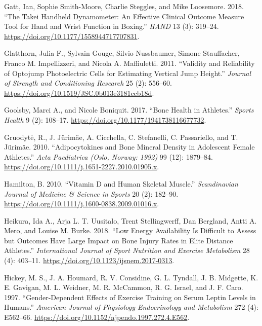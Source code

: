 \documentclass[
]{article}
\newlength{\cslhangindent}
\newenvironment{CSLReferences}[2] %
 {\begin{list}{}{%
  \setlength{\itemindent}{0pt}
  \setlength{\leftmargin}{0pt}
  \setlength{\parsep}{0pt}
  \ifodd #1
   \setlength{\leftmargin}{\cslhangindent}
   \setlength{\itemindent}{-1\cslhangindent}
  \fi
  \setlength{\itemsep}{#2\baselineskip}}}
 {\end{list}}
\begin{document}
\begin{CSLReferences}{1}{0}
Gatt, Ian, Sophie Smith-Moore, Charlie Steggles, and Mike Loosemore. 2018. {``The {Takei} {Handheld} {Dynamometer}: {An} {Effective} {Clinical} {Outcome} {Measure} {Tool} for {Hand} and {Wrist} {Function} in {Boxing}.''} \emph{HAND} 13 (3): 319--24. \url{https://doi.org/10.1177/1558944717707831}.

Glatthorn, Julia F., Sylvain Gouge, Silvio Nussbaumer, Simone Stauffacher, Franco M. Impellizzeri, and Nicola A. Maffiuletti. 2011. {``Validity and Reliability of {Optojump} Photoelectric Cells for Estimating Vertical Jump Height.''} \emph{Journal of Strength and Conditioning Research} 25 (2): 556--60. \url{https://doi.org/10.1519/JSC.0b013e3181ccb18d}.

Goolsby, Marci A., and Nicole Boniquit. 2017. {``Bone {Health} in {Athletes}.''} \emph{Sports Health} 9 (2): 108--17. \url{https://doi.org/10.1177/1941738116677732}.

Gruodytė, R., J. Jürimäe, A. Cicchella, C. Stefanelli, C. Passariello, and T. Jürimäe. 2010. {``Adipocytokines and Bone Mineral Density in Adolescent Female Athletes.''} \emph{Acta Paediatrica (Oslo, Norway: 1992)} 99 (12): 1879--84. \url{https://doi.org/10.1111/j.1651-2227.2010.01905.x}.

Hamilton, B. 2010. {``Vitamin {D} and Human Skeletal Muscle.''} \emph{Scandinavian Journal of Medicine \& Science in Sports} 20 (2): 182--90. \url{https://doi.org/10.1111/j.1600-0838.2009.01016.x}.

Heikura, Ida A., Arja L. T. Uusitalo, Trent Stellingwerff, Dan Bergland, Antti A. Mero, and Louise M. Burke. 2018. {``Low {Energy} {Availability} {Is} {Difficult} to {Assess} but {Outcomes} {Have} {Large} {Impact} on {Bone} {Injury} {Rates} in {Elite} {Distance} {Athletes}.''} \emph{International Journal of Sport Nutrition and Exercise Metabolism} 28 (4): 403--11. \url{https://doi.org/10.1123/ijsnem.2017-0313}.

Hickey, M. S., J. A. Houmard, R. V. Considine, G. L. Tyndall, J. B. Midgette, K. E. Gavigan, M. L. Weidner, M. R. McCammon, R. G. Israel, and J. F. Caro. 1997. {``Gender-Dependent Effects of Exercise Training on Serum Leptin Levels in Humans.''} \emph{American Journal of Physiology-Endocrinology and Metabolism} 272 (4): E562--66. \url{https://doi.org/10.1152/ajpendo.1997.272.4.E562}.


\end{CSLReferences}
\end{document}

